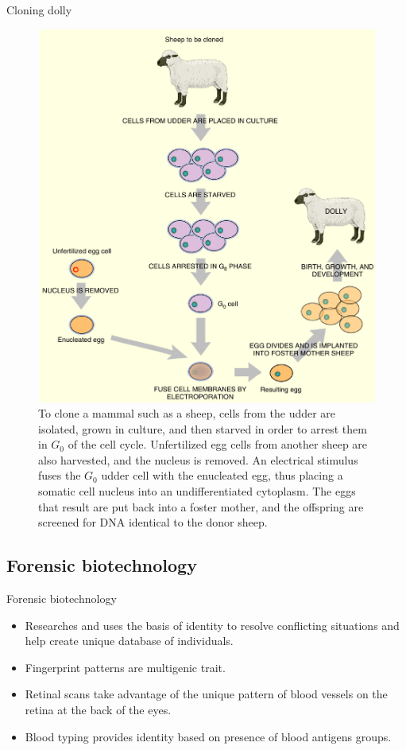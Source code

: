 \documentclass[
  ignorenonframetext,
  aspectratio=169]{beamer}
\providecommand{\tightlist}{%
  \setlength{\itemsep}{0pt}\setlength{\parskip}{0pt}}
\begin{document}
\begin{frame}{Cloning dolly}
\protect\hypertarget{cloning-dolly}{}
\begin{figure}
\includegraphics[width=0.38\linewidth]{../images/dolly_cloning} \caption{To clone a mammal such as a sheep, cells from the udder are isolated, grown in culture, and then starved in order to arrest them in $G_0$ of the cell cycle. Unfertilized egg cells from another sheep are also harvested, and the nucleus is removed. An electrical stimulus fuses the $G_0$ udder cell with the enucleated egg, thus placing a somatic cell nucleus into an undifferentiated cytoplasm. The eggs that result are put back into a foster mother, and the offspring are screened for DNA identical to the donor sheep.}\label{fig:dolly-sheep-cloning}
\end{figure}
\end{frame}

\hypertarget{forensic-biotechnology}{%
\subsection{Forensic biotechnology}\label{forensic-biotechnology}}

\begin{frame}{Forensic biotechnology}
\begin{itemize}
\tightlist
\item
  Researches and uses the basis of identity to resolve conflicting
  situations and help create unique database of individuals.
\item
  Fingerprint patterns are multigenic trait.
\item
  Retinal scans take advantage of the unique pattern of blood vessels on
  the retina at the back of the eyes.
\item
  Blood typing provides identity based on presence of blood antigens
  groups.
\end{itemize}
\end{frame}
\end{document}
